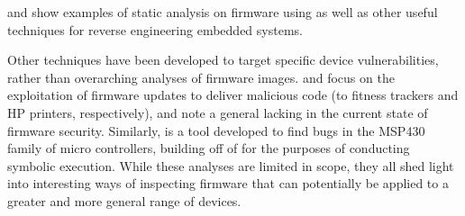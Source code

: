 \documentclass{article}
\begin{document}
\cite{wrt120N2014} and \cite{braindump2011} show examples of static analysis on firmware using \cite{binwalk} as well as other useful techniques for reverse engineering embedded systems.

Other techniques have been developed to target specific device vulnerabilities, rather than overarching analyses of firmware images. \cite{fitnesstrackers2016} and \cite{firmwaremodsattack} focus on the exploitation of firmware updates to deliver malicious code (to fitness trackers and HP printers, respectively), and note a general lacking in the current state of firmware security. Similarly, \cite{fie2013} is a tool developed to find bugs in the MSP430 family of micro controllers, building off of \cite{klee2008} for the purposes of conducting symbolic execution. While these analyses are limited in scope, they all shed light into interesting ways of inspecting firmware that can potentially be applied to a greater and more general range of devices. 




\end{document}
